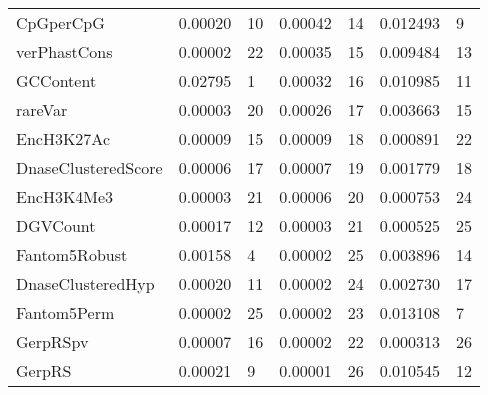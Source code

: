 \begin{tabular}{lll}
CpGperCpG           &        0.00020 &                   10 &            0.00042 &                       14 &       0.012493 &                    9 \\
verPhastCons        &        0.00002 &                   22 &            0.00035 &                       15 &       0.009484 &                   13 \\
GCContent           &        0.02795 &                    1 &            0.00032 &                       16 &       0.010985 &                   11 \\
rareVar             &        0.00003 &                   20 &            0.00026 &                       17 &       0.003663 &                   15 \\
EncH3K27Ac          &        0.00009 &                   15 &            0.00009 &                       18 &       0.000891 &                   22 \\
DnaseClusteredScore &        0.00006 &                   17 &            0.00007 &                       19 &       0.001779 &                   18 \\
EncH3K4Me3          &        0.00003 &                   21 &            0.00006 &                       20 &       0.000753 &                   24 \\
DGVCount            &        0.00017 &                   12 &            0.00003 &                       21 &       0.000525 &                   25 \\
Fantom5Robust       &        0.00158 &                    4 &            0.00002 &                       25 &       0.003896 &                   14 \\
DnaseClusteredHyp   &        0.00020 &                   11 &            0.00002 &                       24 &       0.002730 &                   17 \\
Fantom5Perm         &        0.00002 &                   25 &            0.00002 &                       23 &       0.013108 &                    7 \\
GerpRSpv            &        0.00007 &                   16 &            0.00002 &                       22 &       0.000313 &                   26 \\
GerpRS              &        0.00021 &                    9 &            0.00001 &                       26 &       0.010545 &                   12 \\
\bottomrule
\end{tabular}

